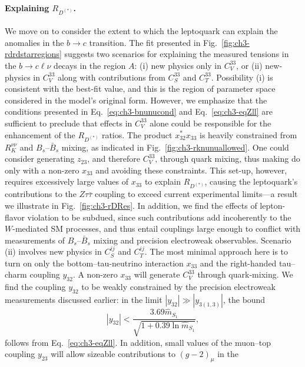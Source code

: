 \paragraph{Explaining $R_{D^{(*)}}$.} We move on to consider the extent to which
the leptoquark can explain the anomalies in the $b\to c$ transition. The fit
presented in Fig.~\ref{fig:ch3-rdrdstarregions} suggests two scenarios for
explaining the measured tensions in the $b \to c \ell \nu$ decays in the region
$A$: (i) new physics only in $C_V^{33}$, or (ii) new-physics in $C_V^{33}$ along
with contributions from $C_S^{33}$ and $C_T^{33}$. Possibility (i) is consistent
with the best-fit value, and this is the region of parameter space considered in
the model's original form. However, we emphasize that the conditions presented
in Eq.~\eqref{eq:ch3-bnunucond} and Eq.~\eqref{eq:ch3-eqZll} are sufficient to preclude
that effects in $C_V^{33}$ alone could be responsible for the enhancement of the
$R_{D^{(*)}}$ ratios. The product $x_{32}^* x_{33}$ is heavily constrained from
$R_K^{\nu\nu}$ and $B_s$--$\bar{B}_s$ mixing, as indicated in
Fig.~\ref{fig:ch3-rknunuallowed}. One could consider generating $z_{23}$, and
therefore $C_V^{33}$, through quark mixing, thus making do only with a non-zero
$x_{33}$ and avoiding these constraints. This set-up, however, requires
excessively large values of $x_{33}$ to explain $R_{D^{(*)}}$, causing the
leptoquark's contributions to the $Z\tau\bar{\tau}$ coupling to exceed current
experimental limits---a result we illustrate in Fig.~\ref{fig:ch3-rDRes}. In addition, we find the effects of lepton-flavor violation to be subdued, since
such contributions add incoherently to the $W$-mediated SM processes, and thus
entail couplings large enough to conflict with measurements of
$B_s$--$\bar{B}_s$ mixing and precision electroweak observables. Scenario (ii)
involves new physics in $C_S^{ij}$ and $C_T^{ij}$. The most minimal approach
here is to turn on only the bottom--tau-neutrino interaction $x_{33}$ and the
right-handed tau--charm coupling $y_{32}$. A non-zero $x_{33}$ will generate
$C_V^{33}$ through quark-mixing. We find the coupling $y_{32}$ to be weakly
constrained by the precision electroweak measurements discussed earlier: in the
limit $|y_{32}| \gg |y_{3 (1,3)}|$, the bound
\begin{equation}
  |y_{32}| < \frac{3.69 \hat{m}_{S_{1}}}{\sqrt{1 + 0.39 \ln \hat{m}_{S_{1}}}},
\end{equation}
follows from Eq.~\eqref{eq:ch3-eqZll}. In addition, small values of the muon--top
coupling $y_{23}$ will allow sizeable contributions to $(g-2)_\mu$ in the
